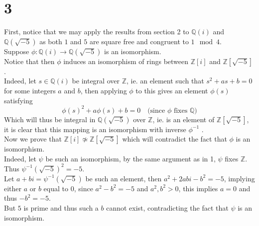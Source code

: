 \documentclass[11pt, a4paper]{article}
\begin{document}
\section*{3}
First, notice that we may apply the results from section 2 to $ \mathbb{Q}( i) $ and $ \mathbb{Q}( \sqrt{-5} ) $ as both $1$ and $5$ are square free and congruent to $1\mod 4$.\\
Suppose $\phi: \mathbb{Q}( i) \to \mathbb{Q}( \sqrt{-5} ) $ is an isomorphism.\\
Notice that then $\phi$ induces an isomorphism of rings between $ \mathbb{Z}[i]$ and $ \mathbb{Z}[\sqrt{-5} ]$.\\
Indeed, let $ s\in \mathbb{Q}( i) $ be integral over $ \mathbb{Z}$, ie. an element such that $ s^{2} + as +b =0$ for some integers $a$ and $b$, then applying $\phi$ to this gives an element $\phi( s) $ satisfying
\[ 
\phi( s) ^{2} + a \phi( s) +b =0 \quad\text{(since $\phi$ fixes $\mathbb{Q}$)} 
\]
Which will thus be integral in $ \mathbb{Q}(  \sqrt{-5} ) $ over $\mathbb{Z}$, ie. is an element of $ \mathbb{Z}[\sqrt{-5} ]$, it is clear that this mapping is an isomorphism with inverse $\phi^{-1}$ .\\
Now we prove that $ \mathbb{Z}[i] \not\simeq \mathbb{Z}[ \sqrt{-5} ]$ which will contradict the fact that $\phi$ is an isomorphism.\\

Indeed, let $\psi $ be such an isomorphism, by the same argument as in 1, $\psi$ fixes $\mathbb{Z}$.\\
Thus $\psi^{-1}(  \sqrt{-5} )^{2}= -5$.\\
Let $a+bi= \psi^{-1}(  \sqrt{-5} ) $ be such an element, then $a^{2}+2abi -b^{2} = -5$, implying either $ a$ or $b$ equal to $0$, since $a^{2}-b^{2} = -5$ and $ a^{2}, b^{2}>0$, this implies $a=0$ and thus $-b^{2} = -5$.\\
But $5$ is prime and thus such a $b$ cannot exist, contradicting the fact that $\psi$ is an isomorphism.





















		
\end{document}
